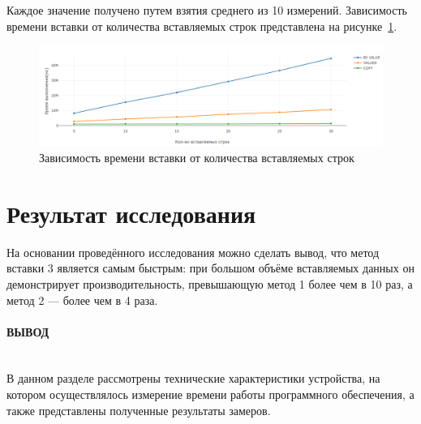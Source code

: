 Каждое значение получено путем взятия среднего из 10 измерений. Зависимость времени вставки от количества вставляемых строк представлена на рисунке~\ref{fig:time_mes}.

\begin{figure}[H]
    \centering
    \includegraphics[width=1\linewidth]{images/plots/mes.png}
    \caption{Зависимость времени вставки от количества вставляемых строк}
    \label{fig:time_mes}
\end{figure}


\section{Результат исследования}

На основании проведённого исследования можно сделать вывод, что метод вставки 3 является самым быстрым: при большом объёме вставляемых данных он демонстрирует производительность, превышающую метод 1 более чем в 10 раз, а метод 2 — более чем в 4 раза.

\paragraph*{ВЫВОД} ${}$ \\

В данном разделе рассмотрены технические характеристики устройства, на котором осуществлялось измерение времени работы программного обеспечения, а также представлены полученные результаты замеров.

